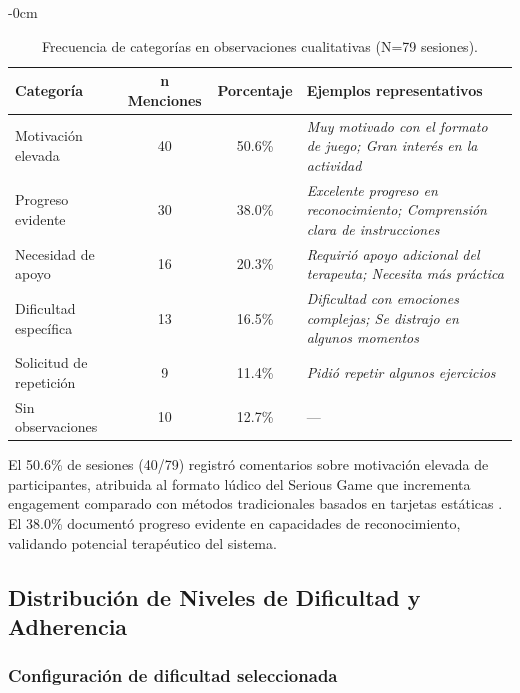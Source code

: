 \documentclass[journal,article,submit,pdftex,moreauthors]{Definitions/mdpi}
\begin{document}
	\begin{table}[H]
		\caption{Frecuencia de categorías en observaciones cualitativas (N=79 sesiones).\label{tab11}}
		\small
		\begin{adjustwidth}{-\extralength}{0cm}
			\begin{tabularx}{\fulllength}{lCCX}
				\toprule
				\textbf{Categoría} & \textbf{n Menciones} & \textbf{Porcentaje} & \textbf{Ejemplos representativos} \\
				\midrule
				Motivación elevada & 40 & 50.6\% & \textit{Muy motivado con el formato de juego; Gran interés en la actividad} \\
				Progreso evidente & 30 & 38.0\% & \textit{Excelente progreso en reconocimiento; Comprensión clara de instrucciones} \\
				Necesidad de apoyo & 16 & 20.3\% & \textit{Requirió apoyo adicional del terapeuta; Necesita más práctica} \\
				Dificultad específica & 13 & 16.5\% & \textit{Dificultad con emociones complejas; Se distrajo en algunos momentos} \\
				Solicitud de repetición & 9 & 11.4\% & \textit{Pidió repetir algunos ejercicios} \\
				Sin observaciones & 10 & 12.7\% & --- \\
				\bottomrule
			\end{tabularx}
		\end{adjustwidth}
	\end{table}
	
	El 50.6\% de sesiones (40/79) registró comentarios sobre motivación elevada de participantes, atribuida al formato lúdico del Serious Game que incrementa engagement comparado con métodos tradicionales basados en tarjetas estáticas \cite{ref24,ref26}. El 38.0\% documentó progreso evidente en capacidades de reconocimiento, validando potencial terapéutico del sistema.
	
	\subsection{Distribución de Niveles de Dificultad y Adherencia}
	
	\subsubsection{Configuración de dificultad seleccionada}
	
\end{document}
